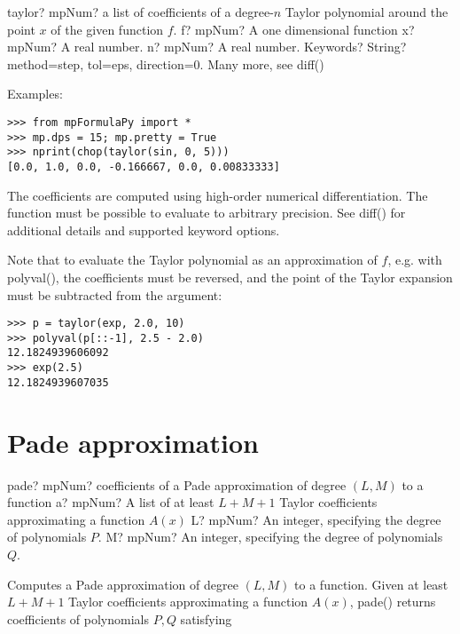 \begin{mpFunctionsExtract}
	\mpFunctionFour
	{taylor? mpNum? a list of coefficients of a degree-$n$ Taylor polynomial around the point $x$ of the given function $f$.}
	{f? mpNum? A one dimensional function}
	{x? mpNum? A real number.}	
	{n? mpNum? A real number.}		
	{Keywords? String?  method=step, tol=eps, direction=0. Many more, see diff()}	
\end{mpFunctionsExtract}


\vpara
Examples:

\begin{lstlisting}
>>> from mpFormulaPy import *
>>> mp.dps = 15; mp.pretty = True
>>> nprint(chop(taylor(sin, 0, 5)))
[0.0, 1.0, 0.0, -0.166667, 0.0, 0.00833333]
\end{lstlisting}

The coefficients are computed using high-order numerical differentiation. The function must be possible to evaluate to arbitrary precision. See diff() for additional details and supported keyword options.

Note that to evaluate the Taylor polynomial as an approximation of $f$, e.g. with polyval(), the coefficients must be reversed, and the point of the Taylor expansion must be subtracted from the argument:

\begin{lstlisting}
>>> p = taylor(exp, 2.0, 10)
>>> polyval(p[::-1], 2.5 - 2.0)
12.1824939606092
>>> exp(2.5)
12.1824939607035
\end{lstlisting}



\newpage
\section{Pade approximation}

\begin{mpFunctionsExtract}
	\mpFunctionThree
	{pade? mpNum? coefficients of a Pade approximation of degree $(L,M)$ to a function}
	{a? mpNum? A list of at least $L+M+1$ Taylor coefficients approximating a function $A(x)$ }
	{L? mpNum? An integer, specifying the degree of polynomials $P$.}	
	{M? mpNum? An integer, specifying the degree of polynomials $Q$.}			
\end{mpFunctionsExtract}


\vpara
Computes a Pade approximation of degree $(L,M)$ to a function. Given at least $L+M+1$ Taylor coefficients approximating a function $A(x)$, pade() returns coefficients of polynomials $P,Q$ satisfying


